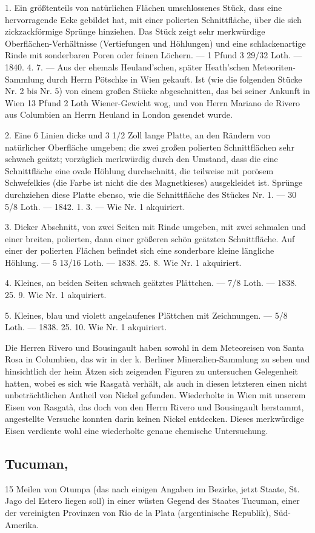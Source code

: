 \documentclass[a4paper, 11pt, oneside, polutonikogreek, german]{article}
\begin{document}
1. Ein größtenteils von natürlichen Flächen umschlossenes Stück, dass eine hervorragende Ecke gebildet hat, mit einer polierten Schnittfläche, über die sich zickzackförmige Sprünge hinziehen. Das Stück zeigt sehr merkwürdige Oberflächen-Verhältnisse (Vertiefungen und Höhlungen) und eine schlackenartige Rinde mit sonderbaren Poren oder feinen Löchern. — 1 Pfund 3 29/32 Loth. — 1840. 4. 7. — Aus der ehemals Heuland'schen, später Heath'schen Meteoriten-Sammlung durch Herrn Pötschke in Wien gekauft. Ist (wie die folgenden Stücke Nr. 2 bis Nr. 5) von einem großen Stücke abgeschnitten, das bei seiner Ankunft in Wien 13 Pfund 2 Loth Wiener-Gewicht wog, und von Herrn Mariano de Rivero aus Columbien an Herrn Heuland in London gesendet wurde.

2. Eine 6 Linien dicke und 3 1/2 Zoll lange Platte, an den Rändern von natürlicher Oberfläche umgeben; die zwei großen polierten Schnittflächen sehr schwach geätzt; vorzüglich merkwürdig durch den Umstand, dass die eine Schnittfläche eine ovale Höhlung durchschnitt, die teilweise mit porösem Schwefelkies (die Farbe ist nicht die des Magnetkieses) ausgekleidet ist. Sprünge durchziehen diese Platte ebenso, wie die Schnittfläche des Stückes Nr. 1. — 30 5/8 Loth. — 1842. 1. 3. — Wie Nr. 1 akquiriert.

3. Dicker Abschnitt, von zwei Seiten mit Rinde umgeben, mit zwei schmalen und einer breiten, polierten, dann einer größeren schön geätzten Schnittfläche. Auf einer der polierten Flächen befindet sich eine sonderbare kleine längliche Höhlung. — 5 13/16 Loth. — 1838. 25. 8. Wie Nr. 1 akquiriert.

4. Kleines, an beiden Seiten schwach geätztes Plättchen. — 7/8 Loth. — 1838. 25. 9. Wie Nr. 1 akquiriert.

5. Kleines, blau und violett angelaufenes Plättchen mit Zeichnungen. — 5/8 Loth. — 1838. 25. 10. Wie Nr. 1 akquiriert.

Die Herren Rivero und Bousingault haben sowohl in dem Meteoreisen von Santa Rosa in Columbien, das wir in der k. Berliner Mineralien-Sammlung zu sehen und hinsichtlich der heim Ätzen sich zeigenden Figuren zu untersuchen Gelegenheit hatten, wobei es sich wie Rasgatà verhält, als auch in diesen letzteren einen nicht unbeträchtlichen Antheil von Nickel gefunden. Wiederholte in Wien mit unserem Eisen von Rasgatà, das doch von den Herrn Rivero und Bousingault herstammt, angestellte Versuche konnten darin keinen Nickel entdecken. Dieses merkwürdige Eisen verdiente wohl eine wiederholte genaue chemische Untersuchung.
\subsection[Tucuman.]{Tucuman,}
\begin{center}
\small
15 Meilen von Otumpa (das nach einigen Angaben im Bezirke, jetzt Staate, St. Jago del Estero liegen soll) in einer wüsten Gegend des Staates Tucuman, einer der vereinigten Provinzen von Rio de la Plata (argentinische Republik), Süd-Amerika.
\end{center}
\end{document}
